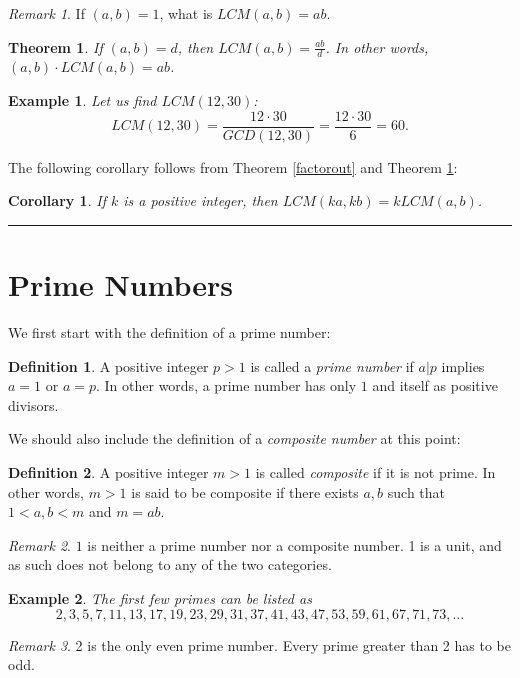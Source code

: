 \documentclass[12pt]{article}
\theoremstyle{plain}
\newtheorem{corollary}{Corollary}
\newtheorem{example}{Example}
\newtheorem{theorem}{Theorem}
\theoremstyle{definition}
\newtheorem{definition}{Definition}
\theoremstyle{remark}
\newtheorem{remark}{Remark}
\begin{document}
\begin{remark}
If $(a,b)=1$, what is $LCM(a,b)=ab$.
\end{remark}

\begin{theorem}\label{gcdlcm}
If $(a,b) = d$, then $LCM(a,b) = \frac{ab}{d}$.
In other words, $(a,b)\cdot LCM(a,b) = ab$.
\end{theorem}

\begin{example} Let us find $LCM(12,30)$:
$$LCM(12, 30) = \frac{12 \cdot 30}{GCD(12,30)} = \frac{12\cdot 30}{6} = 60.$$
\end{example}
The following corollary follows from Theorem \ref{factorout} and Theorem \ref{gcdlcm}:
\begin{corollary}
If $k$ is a positive integer, then  $LCM(ka,kb)=kLCM(a,b)$.
\end{corollary}

\bigskip
\hrule

\section{Prime Numbers}
\bigskip
\noindent
We first start with the definition of a prime number:
\begin{definition}
A positive integer $p>1$ is called a {\it prime number} if $a|p$ implies $a=1$ or $a=p$. In other words, a prime number has only $1$ and itself as positive divisors.  
\end{definition}
We should also include the definition of a {\it composite number} at this point:
\begin{definition}
A positive integer $m>1$ is called {\it composite} if it is not prime. In other words, $m>1$ is said to be composite if there exists $a,b $ such that $1<a, b <m$ and $m=ab$.
\end{definition}
\begin{remark}
$1$ is neither a prime number nor a composite number. 1 is a unit, and as such does not belong to any of the two categories. 
\end{remark}

\begin{example}
The first few primes can be listed as 
$$2, 3, 5, 7, 11, 13, 17, 19, 23, 29, 31, 37, 41, 43, 47, 53, 59, 61, 67, 71, 73, \dots $$
\end{example}
\begin{remark}
2 is the only even prime number. Every prime greater than 2 has to be odd. 
\end{remark}
\end{document}
